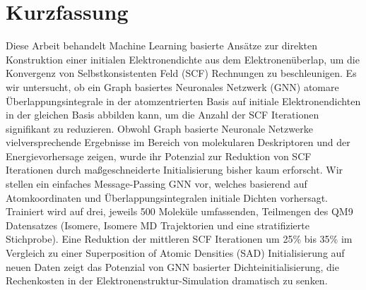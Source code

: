\chapter*{Kurzfassung}

Diese Arbeit behandelt Machine Learning basierte Ansätze zur direkten Konstruktion einer initialen Elektronendichte aus dem Elektronenüberlap, um die Konvergenz von Selbstkonsistenten Feld (SCF) Rechnungen zu beschleunigen. Es wir untersucht, ob ein Graph basiertes Neuronales Netzwerk (GNN) atomare Überlappungsintegrale in der atomzentrierten Basis auf initiale Elektronendichten in der gleichen Basis abbilden kann, um die Anzahl der SCF Iterationen signifikant zu reduzieren. Obwohl Graph basierte Neuronale Netzwerke vielversprechende Ergebnisse im Bereich von molekularen Deskriptoren und der Energievorhersage zeigen, wurde ihr Potenzial zur Reduktion von SCF Iterationen durch maßgeschneiderte Initialisierung bisher kaum erforscht. Wir stellen ein einfaches Message-Passing GNN vor, welches basierend auf Atomkoordinaten und Überlappungsintegralen initiale Dichten vorhersagt. Trainiert wird auf drei, jeweils 500 Moleküle umfassenden, Teilmengen des QM9 Datensatzes (Isomere, Isomere MD Trajektorien und eine stratifizierte Stichprobe). Eine Reduktion der mittleren SCF Iterationen um 25\% bis 35\% im Vergleich zu einer Superposition of Atomic Densities (SAD) Initialisierung auf neuen Daten zeigt das Potenzial von GNN basierter Dichteinitialisierung, die Rechenkosten in der Elektronenstruktur-Simulation dramatisch zu senken.